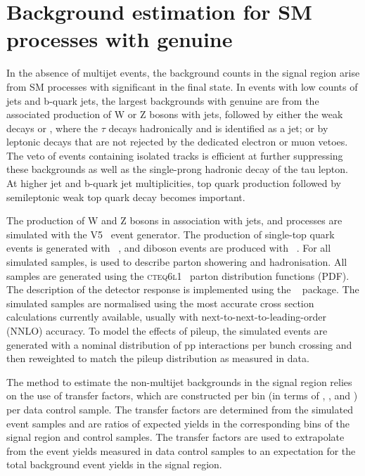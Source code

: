 \section{Background estimation for SM processes with genuine \ETmiss}
\label{sec:ewk_background}

In the absence of multijet events, the background counts in the signal
region arise from SM processes with significant \ETmiss in the final
state. In events with low counts of jets and b-quark jets, the largest
backgrounds with genuine \ETmiss are from the associated production of
W or Z bosons with jets, followed by either the weak decays \znunu or
\wtaunu, where the $\tau$ decays hadronically and is identified as a
jet; or by leptonic decays that are not rejected by the dedicated
electron or muon vetoes. The veto of events containing isolated tracks
is efficient at further suppressing these backgrounds as well as the
single-prong hadronic decay of the tau lepton. At higher jet and
b-quark jet multiplicities, top quark production followed by
semileptonic weak top quark decay becomes important.

The production of W and Z bosons in association with jets, \ttbar and
\gj processes are simulated with the \MADGRAPH V5~\cite{madgraph}
event generator. The production of single-top quark events is
generated with \POWHEG~\cite{powheg}, and diboson events are produced
with ~\cite{pythia8}. For all simulated samples, 
is used to describe parton showering and hadronisation. All samples
are generated using the \textsc{cteq6l1}~\cite{Pumplin:2002vw} parton
distribution functions (PDF). The description of the detector response
is implemented using the \GEANTfour~\cite{geant} package. The
simulated samples are normalised using the most accurate cross section
calculations currently available, usually with
next-to-next-to-leading-order (NNLO) accuracy. To model the effects of
pileup, the simulated events are generated with a nominal distribution
of pp interactions per bunch crossing and then reweighted to match the
pileup distribution as measured in data.

The method to estimate the non-multijet backgrounds in the signal
region relies on the use of transfer factors, which are constructed
per bin (in terms of \njet, \nb, and \scalht) per data control
sample. The transfer factors are determined from the simulated event
samples and are ratios of expected yields in the corresponding bins of
the signal region and control samples. The transfer factors are used
to extrapolate from the event yields measured in data control samples
to an expectation for the total background event yields in the signal
region.

